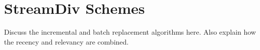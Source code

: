 \section{StreamDiv Schemes}
Discuss the incremental and batch replacement algorithms here. Also explain how the recency and relevancy are combined.